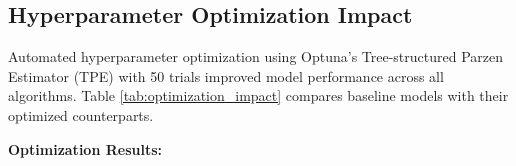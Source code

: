 \subsection{Hyperparameter Optimization Impact}

Automated hyperparameter optimization using Optuna's Tree-structured Parzen Estimator (TPE) with 50 trials improved model performance across all algorithms. Table \ref{tab:optimization_impact} compares baseline models with their optimized counterparts.

\begin{table}[htbp]
\centering
\caption{Impact of Hyperparameter Optimization on Model Performance}
\label{tab:optimization_impact}
\setlength{\tabcolsep}{3.5pt}
\end{table}

\textbf{Optimization Results:}

